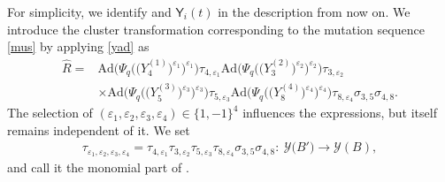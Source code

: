 \documentclass[11pt]{article}
\numberwithin{equation}{section}
\newcommand\rY{{\mathsf{Y}}}
\numberwithin{equation}{section}
\begin{document}
For simplicity, we identify  and $\rY_i(t)$ in the
description from now on. We introduce the cluster transformation
corresponding to the mutation sequence \eqref{mus} by applying
\eqref{yad} as
\begin{align}
\widehat{R} ={}&
\mathrm{Ad}\bigl(\Psi_q\bigl(\bigl(Y^{(1)}_4\bigr)^{\varepsilon_1}\bigr)^{\varepsilon_1}\bigr)\tau_{4,\varepsilon_1}
\mathrm{Ad}\bigl(\Psi_q\bigl(\bigl(Y^{(2)}_3\bigr)^{\varepsilon_2}\bigr)^{\varepsilon_2}\bigr)\tau_{3,\varepsilon_2}\nonumber
\\
 & \times
\mathrm{Ad}\bigl(\Psi_q\bigl(\bigl(Y^{(3)}_5\bigr)^{\varepsilon_3}\bigr)^{\varepsilon_3}\bigr)\tau_{5,\varepsilon_3}
\mathrm{Ad}\bigl(\Psi_q\bigl(\bigl(Y^{(4)}_8\bigr)^{\varepsilon_4}\bigr)^{\varepsilon_4}\bigr)\tau_{8,\varepsilon_4}
\sigma_{3,5}\sigma_{4,8}.\label{rhat}
\end{align}
The selection of $(\varepsilon_1, \varepsilon_2, \varepsilon_3, \varepsilon_4) \in \{1,-1\}^4$
influences the expressions, but  itself remains independent of it.
We set
\begin{align}\label{taue}
\tau_{\varepsilon_1, \varepsilon_2, \varepsilon_3, \varepsilon_4} =
\tau_{4,\varepsilon_1}
\tau_{3,\varepsilon_2}
\tau_{5,\varepsilon_3}
\tau_{8,\varepsilon_4} \sigma_{3,5}\sigma_{4,8}\colon\
\mathcal{Y}\bigl(B'\bigr) \rightarrow \mathcal{Y}(B),
 \end{align}
 and call it the monomial part of .
\end{document}
